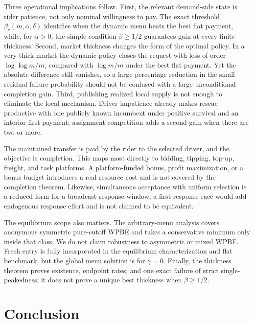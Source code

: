 \documentclass[mnsc,dblanonrev]{informs4}
\begin{document}
Three operational implications follow.  First, the relevant demand-side
state is rider patience, not only nominal willingness to pay.  The exact
threshold $\beta_c(m,\alpha,\delta)$ identifies when the dynamic menu beats the best flat
payment, while, for $\alpha>0$, the simple condition $\beta\ge1/2$ guarantees
gain at every finite thickness.  Second, market thickness changes the form of the optimal
policy.  In a very thick market the dynamic policy closes the request with
loss of order $\log\log m/m$, compared with $\log m/m$ under the best flat
payment.  Yet the absolute difference still vanishes, so a large percentage
reduction in the small residual failure probability should not be confused
with a large unconditional completion gain.  Third, publishing realized
local supply is not enough to eliminate the local mechanism.  Driver
impatience already makes rescue productive with one publicly known incumbent
under positive survival and an interior first payment; assignment competition
adds a second gain when there are two or more.

The maintained transfer is paid by the rider to the selected driver, and the
objective is completion.  This maps most directly to bidding, tipping,
top-up, freight, and task platforms.  A platform-funded bonus, profit
maximization, or a bonus budget introduces a real resource cost and is not
covered by the completion theorem.  Likewise, simultaneous acceptance with
uniform selection is a reduced form for a broadcast response window; a
first-response race would add endogenous response effort and is not claimed
to be equivalent.

The equilibrium scope also matters.  The arbitrary-menu analysis covers
anonymous symmetric pure-cutoff WPBE and takes a conservative minimum only
inside that class.  We do not claim robustness to asymmetric or mixed WPBE.
Fresh entry is fully incorporated in the equilibrium characterization and
flat benchmark, but the global menu solution is for $\gamma=0$.  Finally,
the thickness theorem proves existence, endpoint rates, and one exact
failure of strict single-peakedness; it does not prove a unique best
thickness when $\beta\ge1/2$.

\section{Conclusion}
\label{sec:conclusion}
\end{document}
